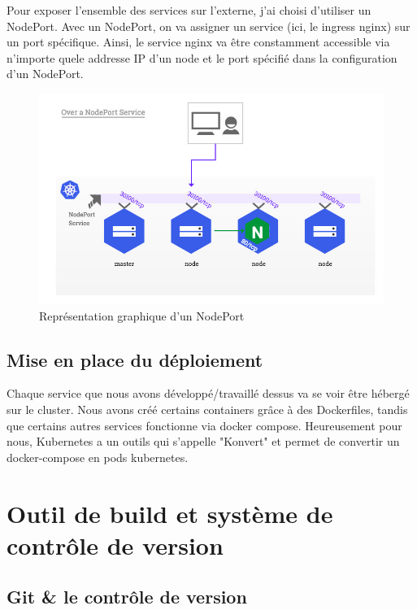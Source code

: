 Pour exposer l'ensemble des services sur l'externe, j'ai choisi d'utiliser un NodePort. Avec un NodePort, on va assigner un service (ici, le ingress nginx) sur un port spécifique. Ainsi, le service nginx va être constamment accessible via n'importe quele addresse IP d'un node et le port spécifié dans la configuration d'un NodePort.

\begin{figure}[H]
    \centering
    \includegraphics[width=\textwidth]{./img/nodeport.jpg}
    \caption{Représentation graphique d'un NodePort}
    \label{fig:node_port}
\end{figure}

\subsection{Mise en place du déploiement}

Chaque service que nous avons développé/travaillé dessus va se voir être hébergé sur le cluster. Nous avons créé certains containers grâce à des Dockerfiles, tandis que certains autres services fonctionne via docker compose. Heureusement pour nous, Kubernetes a un outils qui s'appelle "Konvert" et permet de convertir un docker-compose en pods kubernetes.

\section{Outil de build et système de contrôle de version}

\subsection{Git \& le contrôle de version}

